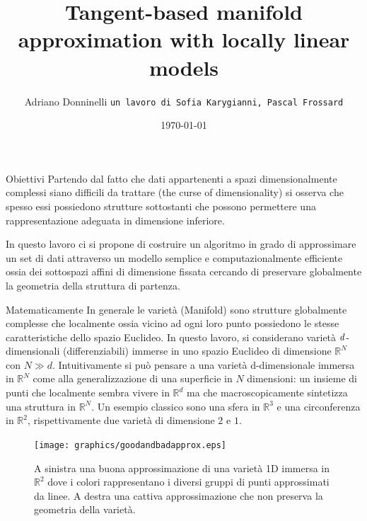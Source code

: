 \documentclass[usenames,dvipsnames,9pt]{beamer}
\title[Università di Bologna]{\Huge{Tangent-based manifold approximation with locally linear models}}
\date[\today]{\small\today}
\author[Adriano Donninelli]{
  Adriano Donninelli
  \pdfnewline
  \texttt{un lavoro di Sofia Karygianni, Pascal Frossard}
}
\institute{Università di Bologna}
\newcommand{\RR}{\mathbb{R}}
\theoremstyle{definition}
\begin{document}
\large

\begin{frame}
\titlepage
\end{frame}

\begin{frame}{Obiettivi}
Partendo dal fatto che dati appartenenti a spazi dimensionalmente complessi siano difficili da trattare (the curse of dimensionality)
si osserva che spesso essi possiedono strutture sottostanti che possono permettere una rappresentazione adeguata in dimensione inferiore.
\vskip 0.2in

In questo lavoro ci si propone di costruire un algoritmo in grado di approssimare un set di dati attraverso un modello semplice e computazionalmente efficiente ossia dei sottospazi affini di dimensione fissata cercando di preservare globalmente la geometria della struttura di partenza.
\end{frame}

\begin{frame}{Matematicamente}
In generale le varietà (Manifold) sono strutture globalmente complesse che localmente ossia vicino ad ogni loro punto possiedono le stesse caratteristiche dello spazio Euclideo. In questo lavoro, si considerano varietà $\it d$-dimensionali (differenziabili) immerse in uno spazio Euclideo di dimensione $\RR^{N}$ con $N \gg d$.
	Intuitivamente si può pensare a una varietà d-dimensionale immersa in $\RR^{N}$ come alla generalizzazione di una superficie in $N$ dimensioni: un insieme di punti che localmente sembra vivere in $\RR^{d}$ ma che macroscopicamente sintetizza una struttura in $\RR^{N}$.
\vskip 0.2in
Un esempio classico sono una sfera in $\RR^{3}$ e una circonferenza in $\RR^{2}$, rispettivamente due varietà di dimensione $2$ e $1$.
\end{frame}

\begin{frame}
\begin{figure}[b]
\centering
\texttt{[image: graphics/goodandbadapprox.eps]}
\caption{A sinistra una buona approssimazione di una varietà 1D immersa in $\RR^{2}$ dove i colori rappresentano i diversi gruppi di punti approssimati da linee. A destra una cattiva approssimazione che non preserva la geometria della varietà.}
\end{figure}
\end{frame}
\end{document}
